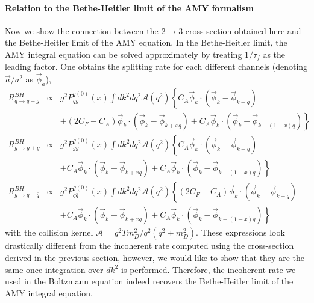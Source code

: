 \begin{appendices}
\paragraph*{Relation to the Bethe-Heitler limit of the AMY formalism}
Now we show the connection between the $2\rightarrow 3$ cross section obtained here and the Bethe-Heitler limit of the AMY equation.
In the Bethe-Heitler limit, the AMY integral equation can be solved approximately by treating $1/\tau_f$ as the leading factor. 
One obtains the splitting rate for each different channels (denoting $\vec{a}/a^2$ as $\vec{\phi}_{a}$), 
\begin{eqnarray}
R_{q\rightarrow q+g}^{BH} &\propto& g^2 P_{qg}^{q(0)}(x) \int d k^2 d q^2 \mathcal{A}(q^2) \left\{
C_A\vec{\phi}_k\cdot\left(\vec{\phi}_k-\vec{\phi}_{k-q}\right) \right.\\\nonumber
&&+\left. (2C_F-C_A) \vec{\phi}_k\cdot\left(\vec{\phi}_k-\vec{\phi}_{k+xq}\right)
+ C_A \vec{\phi}_k\cdot\left(\vec{\phi}_k - \vec{\phi}_{k+(1-x)q}\right)
\right\}
\\
R_{g\rightarrow g+g}^{BH} &\propto& g^2 P_{gg}^{g(0)}(x) \int d k^2 d q^2 \mathcal{A}(q^2) \left\{
C_A\vec{\phi}_k\cdot\left(\vec{\phi}_k-\vec{\phi}_{k-q}\right) \right.\\\nonumber
&&+\left. C_A \vec{\phi}_k\cdot\left(\vec{\phi}_k-\vec{\phi}_{k+xq}\right)
+ C_A \vec{\phi}_k\cdot\left(\vec{\phi}_k - \vec{\phi}_{k+(1-x)q}\right)
\right\}
\\
R_{g\rightarrow q+\bar{q}}^{BH} &\propto& g^2 P_{q\bar{q}}^{g(0)}(x) \int d k^2  d q^2 \mathcal{A}(q^2) \left\{
(2C_F-C_A)\vec{\phi}_k\cdot\left(\vec{\phi}_k-\vec{\phi}_{k-q}\right) \right.\\\nonumber
&&+\left. C_A \vec{\phi}_k\cdot\left(\vec{\phi}_k-\vec{\phi}_{k+xq}\right)
+ C_A \vec{\phi}_k\cdot\left(\vec{\phi}_k - \vec{\phi}_{k+(1-x)q}\right)
\right\}
\end{eqnarray}
with the collision kernel $\mathcal{A} = g^2 T m_D^2/q^2(q^2+m_D^2)$. These expressions look drastically different from the incoherent rate computed using the cross-section derived in the previous section, however, we would like to show that they are the same once integration over $dk^2$ is performed.
Therefore, the incoherent rate we used in the Boltzmann equation indeed recovers the Bethe-Heitler limit of the AMY integral equation.


\end{appendices}
